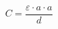 \documentclass[12pt]{article}
\begin{document}
\begin{displaymath}
C=\frac{\varepsilon \cdot a \cdot a}{d}
\end{displaymath}
\end{document}
